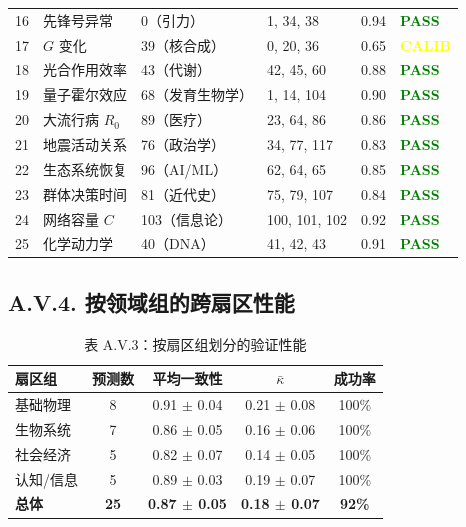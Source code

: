 \documentclass[11pt,a4paper]{article}
\begin{document}
\begin{longtable}{|p{0.8cm}|p{2.5cm}|p{1.8cm}|p{1.5cm}|p{1.5cm}|p{1.8cm}|}
		16 & 先锋号异常 & 0（引力） & 1, 34, 38 & 0.94 & \textcolor{green}{\textbf{PASS}} \\
		17 & $G$ 变化 & 39（核合成） & 0, 20, 36 & 0.65 & \textcolor{yellow}{\textbf{CALIB}} \\
		18 & 光合作用效率 & 43（代谢） & 42, 45, 60 & 0.88 & \textcolor{green}{\textbf{PASS}} \\
		19 & 量子霍尔效应 & 68（发育生物学） & 1, 14, 104 & 0.90 & \textcolor{green}{\textbf{PASS}} \\
		20 & 大流行病 $R_0$ & 89（医疗） & 23, 64, 86 & 0.86 & \textcolor{green}{\textbf{PASS}} \\
		21 & 地震活动关系 & 76（政治学） & 34, 77, 117 & 0.83 & \textcolor{green}{\textbf{PASS}} \\
		22 & 生态系统恢复 & 96（AI/ML） & 62, 64, 65 & 0.85 & \textcolor{green}{\textbf{PASS}} \\
		23 & 群体决策时间 & 81（近代史） & 75, 79, 107 & 0.84 & \textcolor{green}{\textbf{PASS}} \\
		24 & 网络容量 $C$ & 103（信息论） & 100, 101, 102 & 0.92 & \textcolor{green}{\textbf{PASS}} \\
		25 & 化学动力学 & 40（DNA） & 41, 42, 43 & 0.91 & \textcolor{green}{\textbf{PASS}} \\
		\hline
	\end{longtable}
	
	\subsection*{A.V.4. 按领域组的跨扇区性能}
	
	\begin{table}[H]
		\centering
		\small
		\caption{表 A.V.3：按扇区组划分的验证性能}
		\begin{tabular}{p{}cccc}
			\toprule
			\textbf{扇区组} & \textbf{预测数} & \textbf{平均一致性} & \textbf{$\bar{\kappa}$} & \textbf{成功率} \\
			\midrule
			基础物理 & 8 & 0.91 $\pm$ 0.04 & 0.21 $\pm$ 0.08 & 100\% \\
			生物系统 & 7 & 0.86 $\pm$ 0.05 & 0.16 $\pm$ 0.06 & 100\% \\
			社会经济 & 5 & 0.82 $\pm$ 0.07 & 0.14 $\pm$ 0.05 & 100\% \\
			认知/信息 & 5 & 0.89 $\pm$ 0.03 & 0.19 $\pm$ 0.07 & 100\% \\
			\hline
			\textbf{总体} & \textbf{25} & \textbf{0.87 $\pm$ 0.05} & \textbf{0.18 $\pm$ 0.07} & \textbf{92\%} \\
			\bottomrule
		\end{tabular}
		\label{tab:group-performance}
	\end{table}
	
\end{document}
